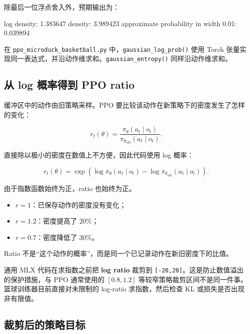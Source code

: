 \documentclass[
  chinese,
  11pt,
  letterpaper,
]{article}
\newenvironment{Shaded}{\begin{snugshade}}{\end{snugshade}}
\newcommand{\NormalTok}[1]{#1}
\providecommand{\tightlist}{%
  \setlength{\itemsep}{0pt}\setlength{\parskip}{0pt}}
\renewenvironment{Shaded}{\par\smallskip}{\par\smallskip}
\begin{document}
除最后一位浮点舍入外，预期输出为：

\begin{Shaded}
\begin{Highlighting}[]
\NormalTok{log density: 1.383647}
\NormalTok{density: 3.989423}
\NormalTok{approximate probability in width 0.01: 0.039894}
\end{Highlighting}
\end{Shaded}

在
\texttt{ppo\_\allowbreak{}microduc\allowbreak{}k\_\allowbreak{}basketba\allowbreak{}ll.py}
中，\texttt{gaussian\_log\_prob()} 使用 Torch
张量实现同一表达式，并沿动作维求和。\texttt{gaussian\_entropy()}
同样沿动作维求和。

\subsection{从 log 概率得到 PPO
ratio}\label{ux4ece-log-ux6982ux7387ux5f97ux5230-ppo-ratio}

缓冲区中的动作由旧策略采样。PPO
要比较该动作在新策略下的密度发生了怎样的变化：

\[
r_t(\theta)
=
\frac{\pi_\theta(a_t\mid o_t)}
{\pi_{\theta_{\mathrm{old}}}(a_t\mid o_t)}.
\]

直接除以极小的密度在数值上不方便，因此代码使用 log 概率：

\[
r_t(\theta)
=
\exp\left(
\log\pi_\theta(a_t\mid o_t)
-
\log\pi_{\theta_{\mathrm{old}}}(a_t\mid o_t)
\right).
\]

由于指数函数始终为正，ratio 也始终为正。

\begin{itemize}
\tightlist
\item
  \(r=1\)：已保存动作的密度没有变化；
\item
  \(r=1.2\)：密度提高了 20\%；
\item
  \(r=0.7\)：密度降低了 30\%。
\end{itemize}

Ratio 不是``这个动作的概率''，而是同一个已记录动作在新旧密度下的比值。

通用 MLX 代码在求指数之前把 \textbf{log ratio} 裁剪到
\texttt{{[}-20,20{]}}。这是防止数值溢出的保护措施，与 PPO 通常使用的
\([0.8,1.2]\)
等较窄策略裁剪区间不是同一件事。篮球训练器目前直接对未限制的 log-ratio
求指数，然后检查 KL 或损失是否出现非有限值。

\subsection{裁剪后的策略目标}\label{ux88c1ux526aux540eux7684ux7b56ux7565ux76eeux6807}
\end{document}
